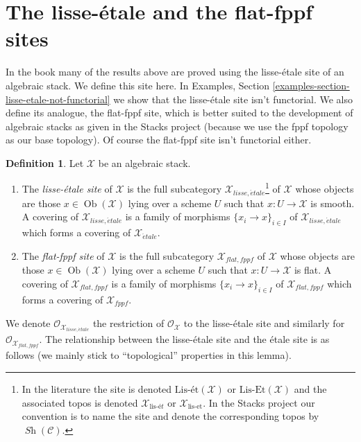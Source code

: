 \documentclass{stacks-project}
\theoremstyle{plain}
\theoremstyle{definition}
\newtheorem{definition}[subsection]{Definition}
\theoremstyle{remark}
\numberwithin{equation}{subsection}
\def\Ob{\mathop{\mathrm{Ob}}\nolimits}
\def\Sh{\mathop{\mathit{Sh}}\nolimits}
\def\etale{{\acute{e}tale}}
\begin{document}
\section{The lisse-\'etale and the flat-fppf sites}
\label{section-lisse-etale}

\noindent
In the book \cite{LM-B} many of the results above are proved using the
lisse-\'etale site of an algebraic stack. We define this site here.
In Examples, Section \ref{examples-section-lisse-etale-not-functorial}
we show that the lisse-\'etale site isn't functorial.
We also define its analogue, the flat-fppf site, which is better suited
to the development of algebraic stacks as given in the Stacks project
(because we use the fppf topology as our base topology). Of course the
flat-fppf site isn't functorial either.

\begin{definition}
\label{definition-lisse-etale}
Let $\mathcal{X}$ be an algebraic stack.
\begin{enumerate}
\item The {\it lisse-\'etale site} of $\mathcal{X}$ is the full subcategory
$\mathcal{X}_{lisse,\etale}$\footnote{In the literature the
site is denoted $\text{Lis-\'et}(\mathcal{X})$ or
$\text{Lis-Et}(\mathcal{X})$ and the associated topos is denoted
$\mathcal{X}_{\text{lis-\'e}t}$ or $\mathcal{X}_{\text{lis-et}}$.
In the Stacks project our convention is to name the site and
denote the corresponding topos by $\Sh(\mathcal{C})$.} of $\mathcal{X}$
whose objects are those $x \in \Ob(\mathcal{X})$ lying over a scheme $U$
such that $x : U \to \mathcal{X}$ is smooth. A covering of
$\mathcal{X}_{lisse,\etale}$ is a family of morphisms
$\{x_i \to x\}_{i \in I}$ of $\mathcal{X}_{lisse,\etale}$
which forms a covering of $\mathcal{X}_\etale$.
\item The {\it flat-fppf site} of $\mathcal{X}$ is the full subcategory
$\mathcal{X}_{flat,fppf}$ of $\mathcal{X}$
whose objects are those $x \in \Ob(\mathcal{X})$ lying over a scheme $U$
such that $x : U \to \mathcal{X}$ is flat. A covering of
$\mathcal{X}_{flat,fppf}$ is a family of morphisms
$\{x_i \to x\}_{i \in I}$ of $\mathcal{X}_{flat,fppf}$
which forms a covering of $\mathcal{X}_{fppf}$.
\end{enumerate}
\end{definition}

\noindent
We denote $\mathcal{O}_{\mathcal{X}_{lisse,\etale}}$
the restriction of $\mathcal{O}_\mathcal{X}$ to the lisse-\'etale site
and similarly for $\mathcal{O}_{\mathcal{X}_{flat,fppf}}$.
The relationship between the lisse-\'etale site and the \'etale site is
as follows (we mainly stick to ``topological'' properties in this lemma).
\end{document}
